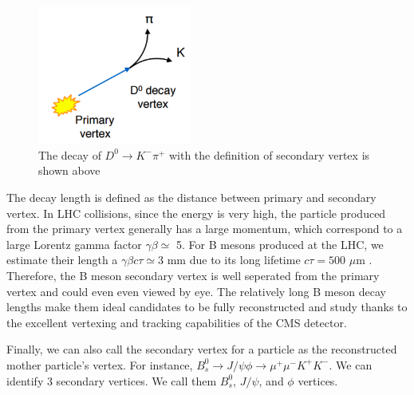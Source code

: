 \begin{figure}[hbtp]
\begin{center}
\includegraphics[width=0.45\textwidth]{Figures/Chapter4/D0Seconary.png}
\caption{The decay of $D^0 \rightarrow K^- \pi^+$ with the definition of secondary vertex is shown above}
\label{D0Vtx}
\end{center}
\end{figure} 

The decay length is defined as the distance between primary and secondary vertex. In LHC collisions, since the energy is very high, the particle produced from the primary vertex generally has a large momentum, which correspond to a large Lorentz gamma factor $\gamma \beta \simeq$ 5. For B mesons produced at the LHC, we estimate their length a $\gamma \beta c \tau \simeq 3$ mm due to its long lifetime $c \tau = 500$ $\mu$m \cite{AlphaTheoEx}. Therefore, the B meson secondary vertex is well seperated from the primary vertex and could even even viewed by eye. The relatively long B meson decay lengths make them ideal candidates to be fully reconstructed and study thanks to the excellent vertexing and tracking capabilities of the CMS detector.

Finally, we can also call the secondary vertex for a particle as the reconstructed mother particle's vertex. For instance, $B^0_s \rightarrow J/\psi \phi \rightarrow \mu^+\mu^- K^+K^-$. We can identify 3 secondary vertices. We call them $B^0_s$, $J/\psi$, and $\phi$ vertices. 

